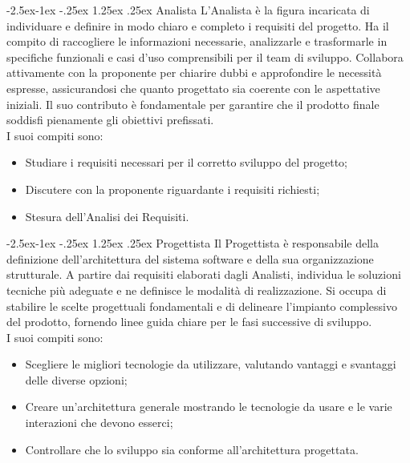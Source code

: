 \documentclass[a4paper,12pt]{article}
\makeatletter
\renewcommand\paragraph{\@startsection{paragraph}{4}{\z@}%
            {-2.5ex\@plus -1ex \@minus -.25ex}%
            {1.25ex \@plus .25ex}%
            {\normalfont\normalsize\bfseries}}
\makeatother
\begin{document}
            \paragraph{Analista}
                L'Analista è la figura incaricata di individuare e definire in modo chiaro e completo i requisiti del progetto.
                Ha il compito di raccogliere le informazioni necessarie, analizzarle e trasformarle in specifiche funzionali e casi d'uso comprensibili per il team di sviluppo.
                Collabora attivamente con la proponente per chiarire dubbi e approfondire le necessità espresse, assicurandosi che quanto progettato sia coerente con le aspettative iniziali.
                Il suo contributo è fondamentale per garantire che il prodotto finale soddisfi pienamente gli obiettivi prefissati.\\
                I suoi compiti sono:
                \begin{itemize}
                    \item Studiare i requisiti necessari per il corretto sviluppo del progetto;
                    \item Discutere con la proponente riguardante i requisiti richiesti;
                    \item Stesura dell'Analisi dei Requisiti.
                \end{itemize}

            \paragraph{Progettista}
                Il Progettista è responsabile della definizione dell'architettura del sistema software e della sua organizzazione strutturale.
                A partire dai requisiti elaborati dagli Analisti, individua le soluzioni tecniche più adeguate e ne definisce le modalità di realizzazione.
                Si occupa di stabilire le scelte progettuali fondamentali e di delineare l'impianto complessivo del prodotto, fornendo linee guida chiare per le fasi successive di sviluppo.\\
                I suoi compiti sono:
                \begin{itemize}
                    \item Scegliere le migliori tecnologie da utilizzare, valutando vantaggi e svantaggi delle diverse opzioni;
                    \item Creare un'architettura generale mostrando le tecnologie da usare e le varie interazioni che devono esserci;
                    \item Controllare che lo sviluppo sia conforme all'architettura progettata.
                \end{itemize}
\end{document}
